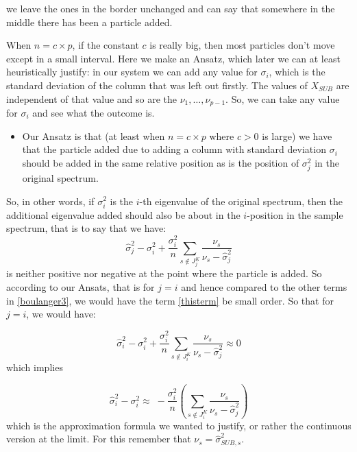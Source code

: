 \documentclass[12pt]{amsart}
\theoremstyle{definition}
\numberwithin{equation}{section}
\numberwithin{equation}{section}
\theoremstyle{remark}
\numberwithin{equation}{section}
\begin{document}
we leave the ones in the border unchanged and can say that somewhere in the middle there has been a particle added.

When $n=c \times p$, if the constant $c$ is really big, then most particles don't move except in a small interval. Here we make an Ansatz, which later we can at least heuristically justify: in our system we can add any value for $\sigma_i$, which is the standard deviation of the column that was left out firstly. The values of $X_{SUB}$ are independent of that value and so are the $\nu_1,\ldots,\nu_{p-1}$. So, we can take any value for $\sigma_i$ and see what the outcome is.
\begin{itemize}
	\item Our Ansatz is that (at least when $n=c \times p$ where $c>0$ is large) we have that the particle added due to adding a column with standard deviation $\sigma_i$ should be added in the same relative position as is the position of $\sigma_j^2$ in the original spectrum.
\end{itemize}

So, in other words, if $\sigma^2_i$ is the $i$-th eigenvalue of the original spectrum, then the additional eigenvalue added should also be about in the $i$-position in the sample spectrum, that is to say that we have:
\begin{equation}
\label{thisterm}
\hat{\sigma}^2_j-\sigma^2_i+\frac{\sigma^2_i}{n}
\sum_{s\notin J^K_j} \frac{\nu_s}{\nu_s-\hat{\sigma}^2_j}
\end{equation}
is neither positive nor negative at the point where the particle is added. So according
to our Ansats, that is for $j=i$ and hence compared to the other terms in \ref{boulanger3},
we would have the term \ref{thisterm} be small order. So that for $j=i$, we would have:

\begin{equation}
\label{thisterm}
\hat{\sigma}^2_i-\sigma^2_i+\frac{\sigma^2_i}{n}
\sum_{s\notin J^K_i} \frac{\nu_s}{\nu_s-\hat{\sigma}^2_j}\approx 0
\end{equation}
which implies

\begin{equation}
\label{boulanger4}
\hat{\sigma}^2_i-\sigma^2_i\approx \; -\frac{\sigma^2_i}{n}
\left(\sum_{s\notin J^K_i} \frac{\nu_s}{\nu_s-\hat{\sigma}^2_j}
\right)
\end{equation}
which is the approximation formula we wanted to justify, or rather the continuous version at the limit. For this remember that $\nu_s=\hat{\sigma}_{SUB,s}^2$.
\end{document}
